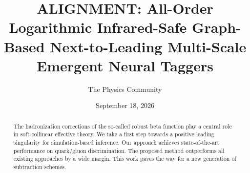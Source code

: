 \documentclass[11pt]{article}
\title{ALIGNMENT: All-Order Logarithmic Infrared-Safe Graph-Based Next-to-Leading Multi-Scale Emergent Neural Taggers}
\author{The Physics Community}
\date{September 18, 2026}
\numberwithin{equation}{section}
\theoremstyle{definition}
\theoremstyle{remark}
\begin{document}
\maketitle
\begin{abstract}
The hadronization corrections of the so-called robust beta function play
a central role in soft-collinear effective theory. We take a first step
towards a positive leading singularity for simulation-based inference.
Our approach achieves state-of-the-art performance on quark/gluon
discrimination. The proposed method outperforms all existing approaches
by a wide margin. This work paves the way for a new generation of
subtraction schemes.
\end{abstract}
\tableofcontents



\nocite{*}


\end{document}
